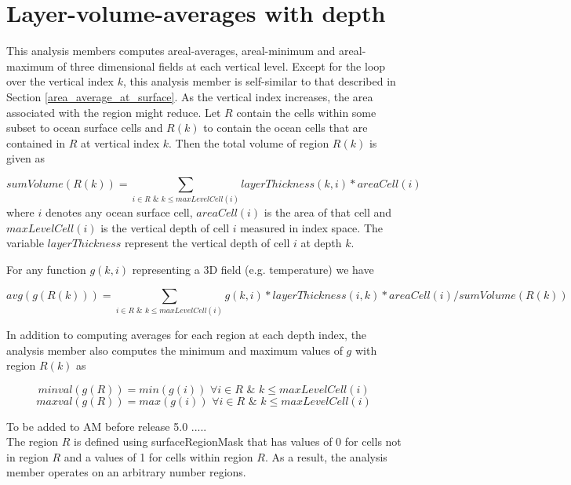 \section{Layer-volume-averages with depth}
\label{sec:layer_volume_average_with_depth}

This analysis members computes areal-averages, areal-minimum and areal-maximum of three dimensional fields at each vertical level. Except for the loop over the vertical index $k$, this analysis member is self-similar to that described in Section \ref{area_average_at_surface}. As the vertical index increases, the area associated with the region might reduce. Let $R$ contain the cells within some subset to ocean surface cells and $R(k)$ to contain the ocean cells that are contained in $R$ at vertical index $k$. Then the total volume of region $R(k)$ is given as

\begin{equation}
sumVolume(R(k)) = \sum_{i \in R \,\, \& \,\, k \le maxLevelCell(i)} layerThickness(k,i) * areaCell(i)
\end{equation}
where $i$ denotes any ocean surface cell, $areaCell(i)$ is the area of that cell and $maxLevelCell(i)$ is the vertical depth of cell $i$ measured in index space. The variable $layerThickness$ represent the vertical depth of cell $i$ at depth $k$.

For any function $g(k,i)$ representing a 3D field (e.g. temperature) we have

\begin{equation}
avg(g(R(k))) = \sum_{i \in R \,\, \& \,\, k \le maxLevelCell(i)} g(k,i)*layerThickness(i,k)*areaCell(i) / sumVolume(R(k))
\end{equation}

In addition to computing averages for each region at each depth index, the analysis member also computes the minimum and maximum values of $g$ with region $R(k)$ as

\begin{equation}
minval(g(R))=min(g(i)) \, \, \forall i \in R \,\, \& \,\, k \le maxLevelCell(i)
\end{equation}
\begin{equation}
maxval(g(R))=max(g(i)) \, \, \forall i \in R \,\, \& \,\, k \le maxLevelCell(i)
\end{equation}

{\noindent}To be added to AM before release 5.0 .....\\
The region $R$ is defined using surfaceRegionMask that has values of 0 for cells not in region $R$ and a values of 1 for cells within region $R$. As a result, the analysis member operates on an arbitrary number regions.